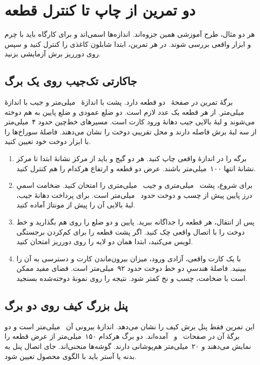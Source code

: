 \section{دو تمرین از چاپ تا کنترل قطعه}

هر دو مثال، طرح آموزشی همین جزوه‌اند. اندازه‌ها اسمی‌اند و برای کارگاه باید با چرم و ابزار واقعی بررسی شوند. در هر تمرین، ابتدا شابلون کاغذی را کنترل کنید و سپس روی دورریز برش آزمایشی بزنید.

\subsection{جاکارتی تک‌جیب روی یک برگ}

برگۀ تمرین در صفحۀ~\pageref{sheet:card} دو قطعه دارد. پشت  با اندازۀ ~میلی‌متر و جیب  با اندازۀ ~میلی‌متر. از هر قطعه یک عدد لازم است. دو ضلع عمودی و ضلع پایین به هم دوخته می‌شوند و لبۀ بالایی جیب دهانۀ ورود کارت است. مسیرهای خط‌چین حدود ۴~میلی‌متر از سه لبۀ برش فاصله دارند و محل تقریبی دوخت را نشان می‌دهند. فاصلۀ سوراخ‌ها را با ابزار دوخت خود تعیین کنید.

\begin{enumerate}
  \item برگه را در اندازۀ واقعی چاپ کنید. هر دو گیج  و  باید از مرکز نشانۀ ابتدا تا مرکز نشانۀ انتها ۱۰۰~میلی‌متر باشند. عرض دو قطعه و ارتفاع هرکدام را هم کنترل کنید.
  \item برای شروع، پشت ~میلی‌متری و جیب ~میلی‌متری را امتحان کنید. ضخامت اسمیِ درز پایین پیش از چسب و دوخت حدود ~میلی‌متر است. برای پرداخت دهانۀ جیب، لبۀ بالایی آن را پیش از مونتاژ آماده کنید.
  \item پس از انتقال، هر قطعه را جداگانه ببرید. پایین و دو ضلع را روی هم بگذارید و خط دوخت را با اتصال واقعی چک کنید. اگر پشت قطعه را برای کم‌کردن برجستگی لویس می‌کنید، ابتدا همان دو لایه را روی دورریز امتحان کنید.
  \item با یک کارت واقعی، آزادی ورود، میزان بیرون‌ماندن کارت و دسترسی به آن را ببینید. فاصلۀ هندسیِ دو خط دوخت حدود ۹۲~میلی‌متر است. فضای مفید ممکن است با ضخامت، چسب و نخ کمتر شود. نتیجه را روی نمونۀ دوخته‌شده بسنجید.
\end{enumerate}

\subsection{پنل بزرگ کیف روی دو برگ}

این تمرین فقط پنل برش کیف را نشان می‌دهد. اندازۀ بیرونی آن ~میلی‌متر است و دو برگۀ  آن در صفحات~\pageref{sheet:panel-left} و~\pageref{sheet:panel-right} آمده‌اند. دو برگ هرکدام ۱۵۰~میلی‌متر از عرض قطعه را نمایش می‌دهند و ۲۰~میلی‌متر هم‌پوشانی دارند. گوشه‌ها منحنی‌اند. جای اتصال پنل به بدنه یا آستر باید با الگوی محصول تعیین شود.

